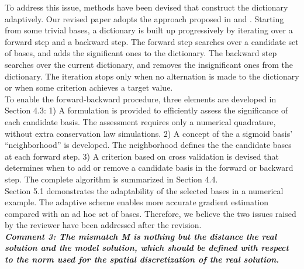 \documentclass[a4paper,twoside]{article}
\begin{document}
To address this issue, methods have been devised that construct the dictionary adaptively. 
Our revised paper adopts the approach proposed in \cite{adaptive basis 1} and \cite{adaptive basis 2}.
Starting from some trivial bases, 
a dictionary is built up progressively by iterating over a forward step and a backward step.
The forward step searches over a candidate set of bases, and adds the significant ones 
to the dictionary.
The backward step searches over the current dictionary, and removes the 
insignificant ones from the dictionary.
The iteration stops only when no alternation is made to the dictionary or when some criterion
achieves a target value.\\

To enable the forward-backward procedure, three elements are developed in Section 4.3:
1) A formulation is provided to efficiently assess the significance of each candidate basis.
The assessment requires only a numerical quadrature, without extra conservation law simulations.
2) A concept of the a sigmoid basis' ``neighborhood'' is developed. 
The neighborhood defines the the candidate bases at each forward step.
3) A criterion based on cross validation is devised that determines when to add or remove a 
candidate basis in the forward or backward step. The complete algorithm is summarized in
Section 4.4.\\

Section 5.1 demonstrates the adaptability of the selected bases in a numerical example. The 
adaptive scheme enables more accurate gradient estimation compared with an ad hoc set of bases.
Therefore, we believe the two issues raised by the reviewer have been addressed after the revision.\\

\emph{\textbf{Comment 3:
The mismatch M is nothing but the distance the real solution and the model solution, which should be defined with respect to the norm used for the spatial discretization of the real solution.}}\\
\end{document}
